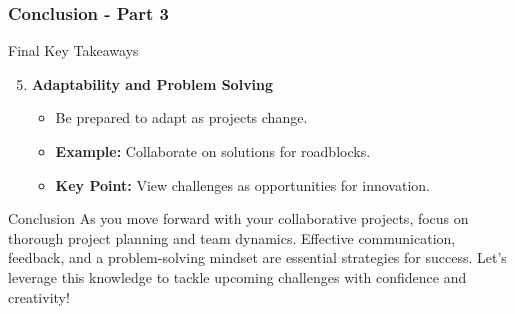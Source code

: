 \documentclass[aspectratio=169]{beamer}
\begin{document}
\begin{frame}[fragile]
    \frametitle{Conclusion - Part 3}
    \begin{block}{Final Key Takeaways}
        \begin{enumerate}
            \setcounter{enumi}{4} %
            \item \textbf{Adaptability and Problem Solving}
            \begin{itemize}
                \item Be prepared to adapt as projects change.
                \item \textbf{Example:} Collaborate on solutions for roadblocks.
                \item \textbf{Key Point:} View challenges as opportunities for innovation.
            \end{itemize}
        \end{enumerate}
    \end{block}
    
    \begin{block}{Conclusion}
        As you move forward with your collaborative projects, focus on thorough project planning and team dynamics. Effective communication, feedback, and a problem-solving mindset are essential strategies for success. Let's leverage this knowledge to tackle upcoming challenges with confidence and creativity!
    \end{block}
\end{frame}
\end{document}
